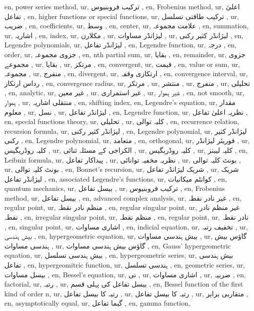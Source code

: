 en, power series method,
ur, ترکیب فروبنیوس ,
en, Frobenius method,
ur, اعلیٰ تفاعل ,
en, higher functions or special functions,
ur, ترکیب طاقتی تسلسل ,
ur,  ضریب  ,
en, coefficients,
ur, وسط ,
en, center,
ur, علامت مجموعہ ,
en, summation,
ur, اشاریہ ,
en, index,
ur, مکلارن ,
ur, لیژانڈر مساوات ,
ur, لیژانڈر کثیر رکنی ,
en, Legendre polynomials,
ur, لیژانڈر تفاعل ,
en, Legendre function,
ur, درجہ ,
en, order,
ur, جزوی مجموعہ ,
en, nth partial sum,
ur, بقایا ,
en, remainder,
ur, جزوی مجموعے ,
ur, بقایا ,
ur, مرتکز ,
en, convergent,
ur, قیمت ,
en, value or sum,
ur, مجموعہ ,
ur, منفرج ,
en, divergent,
ur, ارتکازی وقفہ ,
en, convergence interval,
ur, رداس ارتکاز ,
en, convergence radius,
ur, مرتکز ,
ur, منتشر ,
ur, منفرج ,
ur, تحلیلی ,
en, analytic,
ur, غیر معین ,
ur, غیر استمراری ,
ur, غیر ہموار ,
en, not smooth,
ur, ہموار ,
ur, منتقلی اشاریہ ,
en, shifting index,
en, Legendre's equation,
ur, مقدار معلوم ,
ur, نسل ,
ur, لیژانڈر تفاعل ,
en, Legendre function,
ur, نظریہ اعلیٰ تفاعل ,
en, special functions theory,
ur, تحلیلی ,
ur, کلیہ توالی ,
en, recurrence relation, recursion formula,
ur, لیژانڈر کثیر رکنی ,
en, Legendre polynomial,
ur, لیژانڈر کثیر رکنی ,
en, Legendre polynomial,
ur, متعامد ,
en, orthogonal,
ur, فوریئر لیژانڈر ,
ur, کلیہ روڈریگیس ,
ur, الکراجی کے مسئلہ ثنائی ,
ur, کلیہ روڈریگیس ,
ur, کلیہ لیبنز ,
en, Leibniz formula,
ur, پیداکار تفاعل ,
ur, نظریہ مخفیہ توانائی ,
ur, بونٹ کلیہ توالی ,
ur, بونٹ کلیہ توالی ,
en, Bonnet's recursion,
ur, شریک لیژانڈر تفاعل ,
ur, شریک لیژانڈر تفاعل ,
en, associated Legendre's functions,
ur, کوانٹم میکانیات ,
en, quantum mechanics,
ur, بیسل تفاعل ,
ur, ترکیب فروبنیوس ,
en, Frobenius method,
ur, بیسل تفاعل ,
en, advanced complex analysis,
ur, غیر نادر نقطہ ,
en, regular point,
ur, منظم نادر نقطہ ,
en, regular singular point,
ur, غیر منظم نادر نقطہ ,
en, irregular singular point,
ur, منظم نقطہ ,
en, regular point,
ur, نادر نقطہ ,
en, singular point,
ur, اشاری مساوات ,
en, indicial equation,
ur, تخفیف رتبہ ,
ur, بیش ہندسی ,
en, hypergeometric equation,
ur, بیش ہندسی مساوات ,
ur, گاؤس بیش ہندسی مساوات ,
ur, گاؤس بیش ہندسی مساوات ,
en, Gauss' hypergeometric equation,
ur, بیش ہندسی تسلسل ,
en, hypergeometric series,
ur, بیش ہندسی تفاعل ,
en, hypergeomitric function,
ur, ہندسی تسلسل ,
en, geometric series,
ur, بیسل مساوات ,
en, Bessel's equation,
ur, نی ,
ur, اشاری مساوات ,
ur, ضربیہ ,
en, factorial,
ur, رتبہ ,
ur, بیسل تفاعل کی پہلی قسم ,
en, Bessel function of the first kind of order n,
ur, رتبہ  کا بیسل تفاعل ,
ur, رتبہ  کا بیسل تفاعل ,
ur, متقاربی برابر ,
en, asymptotically equal,
ur, گیما تفاعل ,
en, gamma function,
